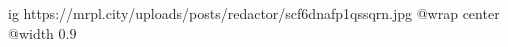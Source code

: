  
 
 
 
 

\ifcmt
  ig https://mrpl.city/uploads/posts/redactor/scf6dnafp1qssqrn.jpg
  @wrap center
  @width 0.9
\fi
